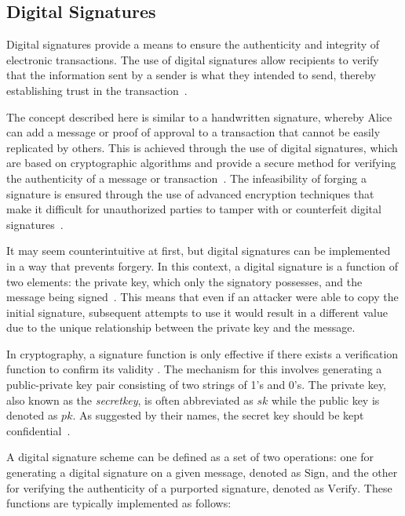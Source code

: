 \subsection{Digital Signatures}
Digital signatures provide a means to ensure the authenticity and integrity of electronic transactions. The use of digital signatures allow recipients to verify that the information sent by a sender is what they intended to send, thereby establishing trust in the transaction~\cite{stinson2018cryptography}.

The concept described here is similar to a handwritten signature, whereby Alice can add a message or proof of approval to a transaction that cannot be easily replicated by others. This is achieved through the use of digital signatures, which are based on cryptographic algorithms and provide a secure method for verifying the authenticity of a message or transaction~\cite{elgamal1985public}. The infeasibility of forging a signature is ensured through the use of advanced encryption techniques that make it difficult for unauthorized parties to tamper with or counterfeit digital
signatures~\cite{elgamal1985public}.

%

It may seem counterintuitive at first, but digital signatures can be implemented in a way that prevents forgery. In this context, a digital signature is a function of two elements: the private key, which only the signatory possesses, and the message being signed~\cite{diffie2022new}. This means that even if an attacker were able to copy the initial signature, subsequent attempts to use it would result in a different value due to the unique relationship between the private key and the message.

In cryptography, a signature function is only effective if there exists a verification function to confirm its validity \cite{stallings2006cryptography}. The mechanism for this involves generating a public-private key pair consisting of two strings of 1's and 0's. The private key, also known as the \textit{secretkey}, is often abbreviated as $sk$ while the public key is denoted as $pk$. As suggested by their names, the secret key should be kept confidential~\cite{dss}.

A digital signature scheme can be defined as a set of two operations: one for generating a digital signature on a given message, denoted as $\text{Sign}$, and the other for verifying the authenticity of a purported signature, denoted as $\text{Verify}$. These functions are typically implemented as follows:

